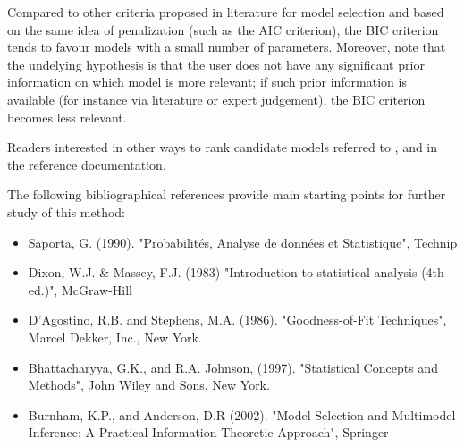             {
              Compared to other criteria proposed in literature for model selection and based on the same idea of penalization (such as the AIC criterion), the BIC criterion tends to favour models with a small number of parameters. Moreover, note that the undelying hypothesis is that the user does not have any significant prior information on which model is more relevant; if such prior information is available (for instance via literature or expert judgement), the BIC criterion becomes less relevant.

              Readers interested in other ways to rank candidate models referred to ,  and  in the reference documentation.

              The following bibliographical references provide main starting points for further study of this method:
              \begin{itemize}
              \item Saporta, G. (1990). "Probabilités, Analyse de données et Statistique", Technip
              \item Dixon, W.J. \& Massey, F.J. (1983) "Introduction to statistical analysis (4th ed.)", McGraw-Hill
              \item D'Agostino, R.B. and Stephens, M.A. (1986). "Goodness-of-Fit Techniques", Marcel Dekker, Inc., New York.
              \item Bhattacharyya, G.K., and R.A. Johnson, (1997). "Statistical Concepts and Methods", John Wiley and Sons, New York.
              \item Burnham, K.P., and Anderson, D.R (2002). "Model Selection and Multimodel Inference: A Practical Information Theoretic Approach", Springer
              \end{itemize}
            }
